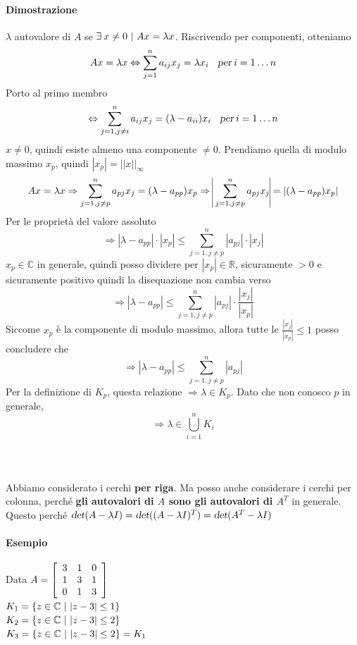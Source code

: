 \documentclass[10pt]{book}
\begin{document}
\paragraph{Dimostrazione} $\lambda$ autovalore di $A$ se $\exists\:x \neq 0 \:\:\vline\:\: Ax = \lambda x$. Riscrivendo per componenti, otteniamo
$$Ax = \lambda x \Leftrightarrow \sum_{j = 1}^n a_{ij}x_j = \lambda x_i\:\:\:\:\textsl{per}\:i = 1\ldots n$$
Porto al primo membro
$$\Leftrightarrow  \sum_{j = 1, j \neq i}^n a_{ij}x_j = (\lambda - a_{ii})x_i\:\:\:\:\textsl{per}\:i = 1\ldots n$$
$x \neq 0$, quindi esiste almeno una componente $\neq 0$. Prendiamo quella di modulo massimo $x_p$, quindi $|x_p| = ||x||_\infty$
$$Ax = \lambda x \Rightarrow \sum_{j = 1, j \neq p}^n a_{pj}x_j = (\lambda - a_{pp})x_p \Rightarrow\:\vline\sum_{j = 1, j \neq p}^n a_{pj}x_j\vline = |(\lambda - a_{pp})x_p|$$
Per le proprietà del valore assoluto
$$\Rightarrow |\lambda - a_{pp}|\cdot|x_p| \leq \sum_{j = 1, j \neq p}^n |a_{pj}|\cdot |x_j| $$
$x_p \in \mathbb{C}$ in generale, quindi posso dividere per $|x_p| \in \mathbb{R}$, sicuramente $> 0$ e sicuramente positivo quindi la disequazione non cambia verso
$$\Rightarrow |\lambda - a_{pp}| \leq \sum_{j = 1, j \neq p}^n |a_{pj}|\cdot \frac{|x_j|}{|x_p|} $$
Siccome $x_p$ è la componente di modulo massimo, allora tutte le $\frac{|x_j|}{|x_p|} \leq 1$ posso concludere che
$$\Rightarrow |\lambda - a_{pp}| \leq \sum_{j = 1, j \neq p}^n |a_{pj}|$$
Per la definizione di $K_p$, questa relazione $\Rightarrow \lambda \in K_p$. Dato che non conosco $p$ in generale, $$\Rightarrow \lambda \in \bigcup_{i = 1}^n K_i$$\\\\\\
Abbiamo considerato i cerchi \textbf{per riga}. Ma posso anche considerare i cerchi per colonna, perché \textbf{gli autovalori di $A$ sono gli autovalori di $A^T$} in generale.\\
Questo perché $\textsl{det}(A - \lambda I) = \textsl{det}((A - \lambda I)^T) = \textsl{det}(A^T - \lambda I)$
\paragraph{Esempio} Data \begin{math}
A = \left[ 
	\begin{array}{c c c}
		3 & 1 & 0\\
		1 & 3 & 1\\
		0 & 1 & 3
	\end{array}
	\right]
\end{math}\\
$K_1 = \left\{ z \in \mathbb{C} \:\:\vline\:\: |z - 3| \leq 1\right\}$\\
$K_2 = \left\{ z \in \mathbb{C} \:\:\vline\:\: |z - 3| \leq 2\right\}$\\
$K_3 = \left\{ z \in \mathbb{C} \:\:\vline\:\: |z - 3| \leq 2\right\} = K_1$
\end{document}
